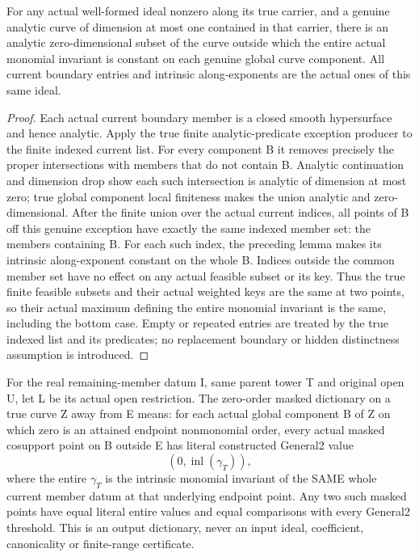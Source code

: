 \begin{theorem}
\label{hir:member-monomial-actual-component-history}
\leanok
For any actual well-formed ideal nonzero along its true carrier, and a genuine
analytic curve of dimension at most one contained in that carrier, there is
an analytic zero-dimensional subset of the curve outside which the entire
actual monomial invariant is constant on each genuine global curve component.
All current boundary entries and intrinsic along-exponents are the actual
ones of this same ideal.
\end{theorem}
\begin{proof}
Each actual current boundary member is a closed smooth hypersurface and hence
analytic. Apply the true finite analytic-predicate exception producer to the
finite indexed current list. For every component B it removes precisely the
proper intersections with members that do not contain B. Analytic continuation
and dimension drop show each such intersection is analytic of dimension at
most zero; true global component local finiteness makes the union analytic
and zero-dimensional. After the finite union over the actual current indices,
all points of B off this genuine exception have exactly the same indexed
member set: the members containing B. For each such index, the preceding
lemma makes its intrinsic along-exponent constant on the whole B. Indices
outside the common member set have no effect on any actual feasible subset
or its key. Thus the true finite feasible subsets and their actual weighted
keys are the same at two points, so their actual maximum defining the entire
monomial invariant is the same, including the bottom case. Empty or repeated
entries are treated by the true indexed list and its predicates; no replacement
boundary or hidden distinctness assumption is introduced.
\end{proof}

\begin{definition}
\label{hir:member-monomial-masked-value-dictionary}
\leanok
For the real remaining-member datum I, same parent tower T and original open
U, let L be its actual open restriction. The zero-order masked dictionary on
a true curve Z away from E means: for each actual global component B of Z
on which zero is an attained endpoint nonmonomial order, every actual masked
cosupport point on B outside E has literal constructed General2 value
\[
  (0,\operatorname{inl}(\gamma_T)),
\]
where the entire \(\gamma_T\) is the intrinsic monomial invariant of the SAME
whole current member datum at that underlying endpoint point. Any two such
masked points have equal literal entire values and equal comparisons with
every General2 threshold. This is an output dictionary, never an input
ideal, coefficient, canonicality or finite-range certificate.
\end{definition}

